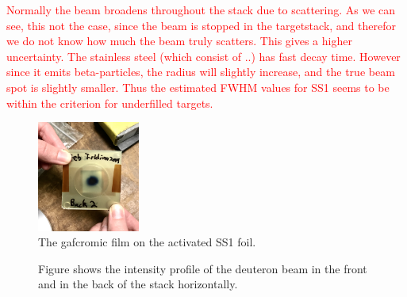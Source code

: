\textcolor{red}{Normally the beam broadens throughout the stack due to scattering. As we can see, this not the case, since the beam is stopped in the targetstack, and therefor we do not know how much the beam truly scatters. This gives a higher uncertainty.  
The stainless steel (which consist of ..) has fast decay time. However since it emits beta-particles, the radius will slightly increase, and the true beam spot is slightly smaller. Thus the estimated FWHM values for SS1  seems to be within the criterion for underfilled targets. }



\begin{figure}
    \centering
    \includegraphics[width=0.3\textwidth]{Experiment/gafchromic_beamprofile.jpg}
    \caption{The gafcromic film on the activated SS1 foil. }
    \label{fig:SS1_gafchromic}
\end{figure}

\begin{figure}%
    \centering
    
    \quad
    \caption{Figure shows the intensity profile of the deuteron beam in the front and in the back of the stack horizontally.}%
    \label{fig:beamprofile}%
\end{figure}


